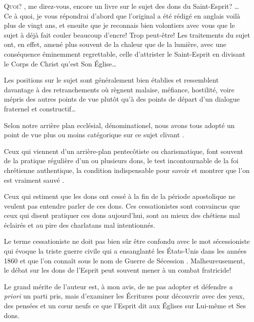 
{\itshape

\lettrine[ante=\Og]{Q}{uoi?} \Fg{}, me direz-vous, \Og encore un livre sur le sujet des dons du Saint-Esprit? \Fg{}\dots{}\\[1ex]
Ce à quoi, je vous répondrai d'abord que l'original a été rédigé en anglais voilà plus de vingt ans, et ensuite que je reconnais bien volontiers avec vous que le sujet à déjà fait couler beaucoup d'encre! Trop peut-être! Les traitements du sujet ont, en effet, amené plus souvent de la \Og chaleur \Fg{} que de la lumière, avec une conséquence éminemment regrettable, celle d'attrister le Saint-Esprit en divisant le Corps de Christ qu'est Son \'Eglise\dots{}

Les positions sur le sujet sont généralement bien établies et ressemblent davantage à des retranchements où règnent malaise, méfiance, hostilité, voire mépris des autres points de vue plutôt qu'à des points de départ d'un dialogue fraternel et constructif\dots{}

Selon notre arrière plan ecclésial, dénominationel, nous avons tous adopté un point de vue plus ou moins catégorique sur ce sujet \Og clivant \Fg{}.

Ceux qui viennent d'un arrière-plan pentecôtiste ou charismatique, font souvent de la pratique régulière d'un ou plusieurs dons, le test incontournable de la foi chrétienne authentique, la condition indispensable pour savoir et montrer que l'on est \Og vraiment sauvé \Fg{}.

Ceux qui estiment que les dons ont cessé à la fin de la période apostolique ne veulent pas entendre parler de ces dons. Ces \Og cessationistes \Fg{} sont convaincus que ceux qui disent pratiquer ces dons aujourd'hui, sont au mieux des chétiens mal éclairés et au pire des charlatans mal intentionnés.

Le terme \Og cessationiste \Fg{} ne doit pas bien sûr être confondu avec le mot \Og sécessioniste \Fg{} qui évoque la triste guerre civile qui a ensanglanté les \'Etats-Unis dans les années 1860 et que l'on connaît sous le nom de \Og Guerre de Sécession \Fg{}.
 Malheureusement, le débat sur les dons de l'Esprit peut souvent mener à un combat fratricide!

Le grand mérite de l'auteur est, à mon avis, de ne pas adopter et défendre \emph{a priori} un parti pris,
 mais \Og d'examiner les \'Ecritures \Fg{} pour découvrir avec des yeux,
 des pensées et un c\oe{}ur neufs \Og ce que l'Esprit dit aux \'Eglises \Fg{}
 sur Lui-même et Ses dons.

}
